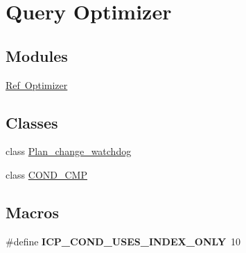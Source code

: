 \hypertarget{group__Query__Optimizer}{}\section{Query Optimizer}
\label{group__Query__Optimizer}
\subsection*{Modules}
\begin{DoxyCompactItemize}
\item 
\mbox{\hyperlink{group__RefOptimizerModule}{Ref Optimizer}}
\end{DoxyCompactItemize}
\subsection*{Classes}
\begin{DoxyCompactItemize}
\item 
class \mbox{\hyperlink{classPlan__change__watchdog}{Plan\+\_\+change\+\_\+watchdog}}
\item 
class \mbox{\hyperlink{classCOND__CMP}{C\+O\+N\+D\+\_\+\+C\+MP}}
\end{DoxyCompactItemize}
\subsection*{Macros}
\begin{DoxyCompactItemize}
\item 
\mbox{\label{group__Query__Optimizer_ga8976c581bb885405f6b19a1753e6e6dd}} 
\#define {\bfseries I\+C\+P\+\_\+\+C\+O\+N\+D\+\_\+\+U\+S\+E\+S\+\_\+\+I\+N\+D\+E\+X\+\_\+\+O\+N\+LY}~10
\end{DoxyCompactItemize}
